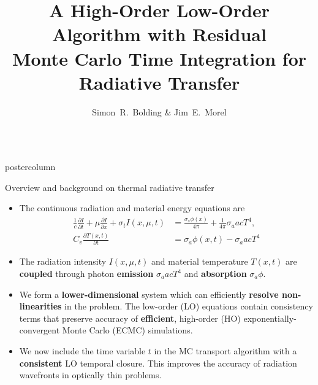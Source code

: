 \documentclass[xcolor=dvipsnames]{beamer}
\title{\color{black}A High-Order Low-Order Algorithm with Residual \\ Monte Carlo Time
Integration for Radiative Transfer}
\author{\large Simon~R.~Bolding \& Jim~E.~Morel}
\institute{Department of Nuclear Engineering,
Texas A\&M University -- CERT Project}
\newcommand{\pderiv}[2]{\frac{\partial #1}{\partial #2}}
\newcommand{\colb}[1]{{\color{blue} #1}}
\newcommand\highlight[1]{%
          \colorbox{myblue!32}{\begin{varwidth}{\dimexpr\linewidth-2\fboxsep}#1\end{varwidth}}}
\newlength{\columnheight}
\begin{document}
\begin{frame}
\begin{columns}

\begin{column}{.49\textwidth}
\begin{beamercolorbox}[center,wd=\textwidth]{postercolumn}
\begin{minipage}[T]{0.95\textwidth} %
\parbox[t][\columnheight]{\textwidth}{ %
       \begin{block}{Overview and background on thermal radiative transfer}
         \begin{itemize}
             \setlength{\itemsep}{0.6em}
             \item The continuous radiation and material energy
                 equations are
\begin{align}
    \frac{1}{c}\pderiv{I}{t} + \mu \pderiv{I}{x} + \sigma_t I(x,\mu,t)
    &= \frac{\sigma_s \phi(x)}{4\pi} +  \frac{1}{4\pi} \sigma_a a c T^4,\label{ho_trans}
  \\
  C_v \pderiv{T(x,t)}{t} &=  {\sigma_a \phi(x,t)} - {\sigma_a a c T^4} \label{lo_mat}
\end{align}
     \item The radiation intensity $I(x,\mu,t)$ and material temperature
         $T(x,t)$ are
         \textbf{coupled}
         through photon \textbf{emission} $\sigma_a a c T^4$ and
         \textbf{absorption} $\sigma_a \phi$.
      \item We form a \textbf{lower-dimensional} system which can
          efficiently \textbf{resolve non-linearities} in the problem.  The low-order
          (LO) equations contain consistency terms that preserve accuracy
          of \textbf{efficient}, high-order (HO) exponentially-convergent Monte Carlo (ECMC) simulations.
      \item[] \highlight{We now include the time variable $t$ in the MC transport
              algorithm with a \textbf{consistent} LO temporal closure.  \colb{This improves
              the accuracy of radiation wavefronts in optically thin problems.}}
      \end{itemize}
         \end{block}
         \vfill

}
\end{minipage}
\end{beamercolorbox}
\end{column}
\end{columns}
\end{frame}
\end{document}
